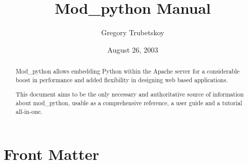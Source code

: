 \documentclass{manual}
\title{Mod\_python Manual}
\author{Gregory Trubetskoy}
\date{August 26, 2003}
\begin{document}
\maketitle

\ifhtml
\chapter*{Front Matter\label{front}}
\fi



\begin{abstract}

\noindent
Mod_python allows embedding Python within the Apache server for a considerable
boost in performance and added flexibility in designing web based
applications.

This document aims to be the only necessary and authoritative source of
information about mod_python, usable as a comprehensive reference, a user guide
and a tutorial all-in-one.

\begin{seealso}
\end{seealso}

\end{abstract}

\tableofcontents

\appendix


\end{document}
